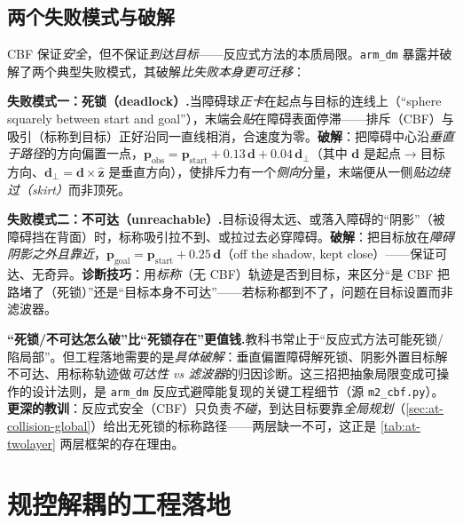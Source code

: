 \subsection{两个失败模式与破解}
\label{subsec:at-cbf-fail}

CBF 保证\emph{安全}，但不保证\emph{到达目标}——反应式方法的本质局限。\texttt{arm\_dm} 暴露并破解了两个典型失败模式，其破解\emph{比失败本身更可迁移}：

\begin{pitfall}
\textbf{失败模式一：死锁（deadlock）.}\;当障碍球\emph{正卡}在起点与目标的连线上（``sphere squarely between start and goal''），末端会\emph{贴}在障碍表面停滞——排斥（CBF）与吸引（标称到目标）正好沿同一直线相消，合速度为零。\textbf{破解}：把障碍中心沿\emph{垂直于路径}的方向偏置一点，$\mathbf{p}_{\mathrm{obs}}=\mathbf{p}_{\mathrm{start}}+0.13\,\mathbf{d}+0.04\,\mathbf{d}_\perp$（其中 $\mathbf{d}$ 是起点$\to$目标方向、$\mathbf{d}_\perp=\mathbf{d}\times\hat{\mathbf{z}}$ 是垂直方向），使排斥力有一个\emph{侧向}分量，末端便从一侧\emph{贴边绕过（skirt）}而非顶死。
\end{pitfall}

\begin{pitfall}
\textbf{失败模式二：不可达（unreachable）.}\;目标设得太远、或落入障碍的``阴影''（被障碍挡在背面）时，标称吸引拉不到、或拉过去必穿障碍。\textbf{破解}：把目标放在\emph{障碍阴影之外且靠近}，$\mathbf{p}_{\mathrm{goal}}=\mathbf{p}_{\mathrm{start}}+0.25\,\mathbf{d}$（off the shadow, kept close）——保证可达、无奇异。\textbf{诊断技巧}：用\emph{标称}（无 CBF）轨迹是否到目标，来区分“是 CBF 把路堵了（死锁）”还是“目标本身不可达”——若标称都到不了，问题在目标设置而非滤波器。
\end{pitfall}

\begin{insight}
\textbf{“死锁/不可达怎么破”比“死锁存在”更值钱.}\;教科书常止于“反应式方法可能死锁/陷局部”。但工程落地需要的是\emph{具体破解}：垂直偏置障碍解死锁、阴影外置目标解不可达、用标称轨迹做\emph{可达性 vs 滤波器}的归因诊断。这三招把抽象局限变成可操作的设计法则，是 \texttt{arm\_dm} 反应式避障能复现的关键工程细节（源 \texttt{m2\_cbf.py}）。\textbf{更深的教训}：反应式安全（CBF）只负责\emph{不碰}，到达目标要靠\emph{全局规划}（\cref{sec:at-collision-global}）给出无死锁的标称路径——两层缺一不可，这正是 \cref{tab:at-twolayer} 两层框架的存在理由。
\end{insight}

\section{规控解耦的工程落地}
\label{sec:at-decouple}


